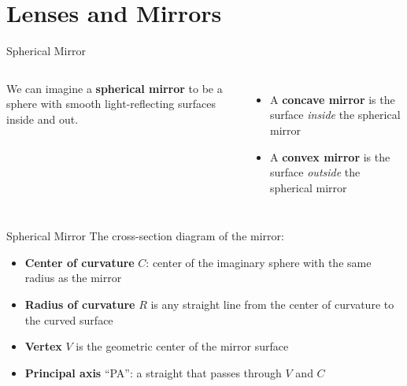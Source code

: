 \documentclass[12pt,compress,aspectratio=169]{beamer}
\begin{document}
\section{Lenses and Mirrors}

\begin{frame}{Spherical Mirror}
  \begin{columns}
    We can imagine a \textbf{spherical mirror} to be a sphere with smooth
    light-reflecting surfaces inside and out.
    \begin{itemize}
    \item A \textbf{concave mirror} is the surface \emph{inside} the spherical
      mirror
    \item A \textbf{convex mirror} is the surface \emph{outside} the spherical
      mirror
    \end{itemize}
  \end{columns}
\end{frame}



\begin{frame}{Spherical Mirror}
  The cross-section diagram of the mirror:
  \begin{center}
  \end{center}
  \begin{itemize}
  \item\textbf{Center of curvature} $C$: center of the imaginary sphere
    with the same radius as the mirror
  \item\textbf{Radius of curvature} $R$ is any straight line from the
    center of curvature to the curved surface
  \item\textbf{Vertex} $V$ is the geometric center of the mirror surface
  \item\textbf{Principal axis} ``PA'': a straight that passes through $V$ and
    $C$
  \end{itemize}
\end{frame}
\end{document}
